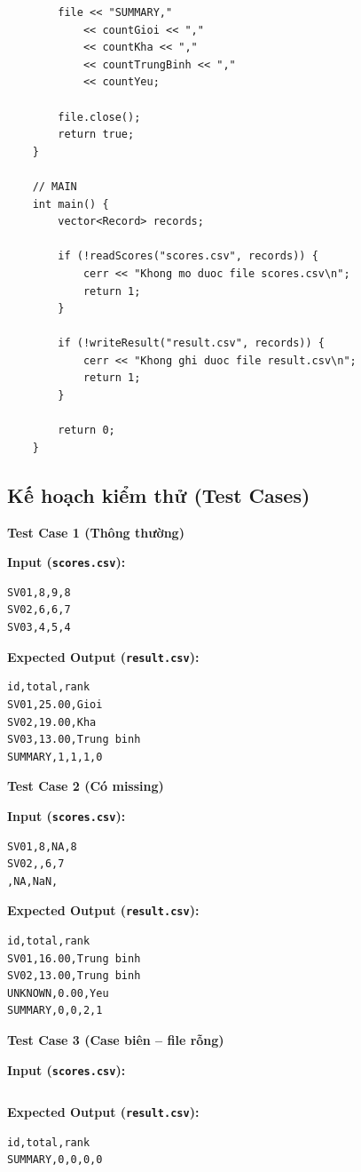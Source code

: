 \begin{lstlisting}
        file << "SUMMARY,"
            << countGioi << ","
            << countKha << ","
            << countTrungBinh << ","
            << countYeu;

        file.close();
        return true;
    }

    // MAIN
    int main() {
        vector<Record> records;

        if (!readScores("scores.csv", records)) {
            cerr << "Khong mo duoc file scores.csv\n";
            return 1;
        }

        if (!writeResult("result.csv", records)) {
            cerr << "Khong ghi duoc file result.csv\n";
            return 1;
        }

        return 0;
    }
\end{lstlisting}

\subsection{Kế hoạch kiểm thử (Test Cases)}

\textbf{Test Case 1 (Thông thường)}

\textbf{Input (\texttt{scores.csv}):}
\begin{lstlisting}
SV01,8,9,8
SV02,6,6,7
SV03,4,5,4
\end{lstlisting}

\textbf{Expected Output (\texttt{result.csv}):}
\begin{lstlisting}
id,total,rank
SV01,25.00,Gioi
SV02,19.00,Kha
SV03,13.00,Trung binh
SUMMARY,1,1,1,0
\end{lstlisting}

\vspace{0.5cm}

\textbf{Test Case 2 (Có missing)}

\textbf{Input (\texttt{scores.csv}):}
\begin{lstlisting}
SV01,8,NA,8
SV02,,6,7
,NA,NaN,
\end{lstlisting}

\textbf{Expected Output (\texttt{result.csv}):}
\begin{lstlisting}
id,total,rank
SV01,16.00,Trung binh
SV02,13.00,Trung binh
UNKNOWN,0.00,Yeu
SUMMARY,0,0,2,1
\end{lstlisting}

\vspace{0.5cm}

\textbf{Test Case 3 (Case biên -- file rỗng)}

\textbf{Input (\texttt{scores.csv}):}
\begin{lstlisting}
\end{lstlisting}

\textbf{Expected Output (\texttt{result.csv}):}
\begin{lstlisting}
id,total,rank
SUMMARY,0,0,0,0
\end{lstlisting}